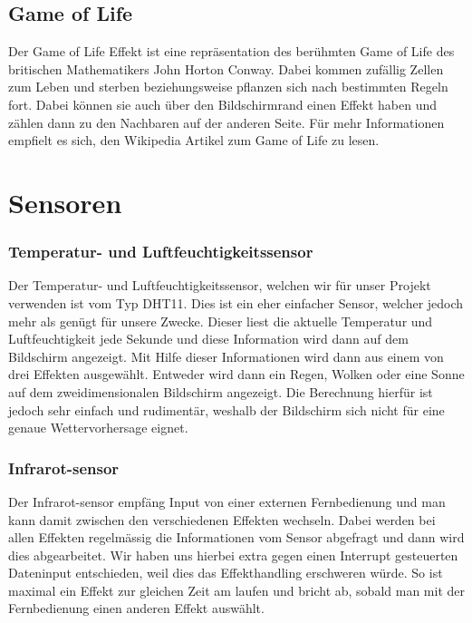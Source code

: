 \documentclass[12pt,a4paper]{article}
\begin{document}
\subsection{Game of Life}

Der Game of Life Effekt ist eine repräsentation des berühmten Game of Life des britischen Mathematikers John Horton Conway. Dabei kommen  zufällig Zellen zum Leben und sterben beziehungsweise pflanzen sich nach bestimmten Regeln fort. Dabei können sie auch über den Bildschirmrand einen Effekt haben und zählen dann zu den Nachbaren auf der anderen Seite. Für mehr Informationen empfielt es sich, den Wikipedia Artikel zum Game of Life zu lesen.

\section{Sensoren}

\subsubsection{Temperatur- und Luftfeuchtigkeitssensor}

Der Temperatur- und Luftfeuchtigkeitssensor, welchen wir für unser Projekt verwenden ist vom Typ DHT11. Dies ist ein eher einfacher Sensor, welcher jedoch mehr als genügt für unsere Zwecke. Dieser liest die aktuelle Temperatur und Luftfeuchtigkeit jede Sekunde und diese Information wird dann auf dem Bildschirm angezeigt. Mit Hilfe dieser Informationen wird dann aus einem von drei Effekten ausgewählt. Entweder wird dann ein Regen, Wolken oder eine Sonne auf dem zweidimensionalen Bildschirm angezeigt. Die Berechnung hierfür ist jedoch sehr einfach und rudimentär, weshalb der Bildschirm sich nicht für eine genaue Wettervorhersage eignet. 

\subsubsection{Infrarot-sensor}

Der Infrarot-sensor empfäng Input von einer externen Fernbedienung und man kann damit zwischen den verschiedenen Effekten wechseln. Dabei werden bei allen Effekten regelmässig die Informationen vom Sensor abgefragt und dann wird dies abgearbeitet. Wir haben uns hierbei extra gegen einen Interrupt gesteuerten Dateninput entschieden, weil dies das Effekthandling erschweren würde. So ist maximal ein Effekt zur gleichen Zeit am laufen und bricht ab, sobald man mit der Fernbedienung einen anderen Effekt auswählt.
\end{document}
